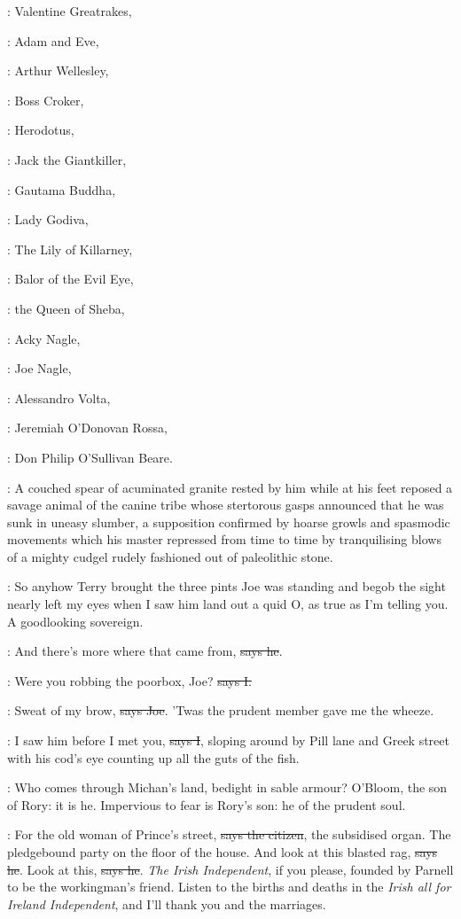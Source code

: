 :
Valentine Greatrakes,

:
Adam and Eve,

:
Arthur Wellesley,

:
Boss Croker,

:
Herodotus,

:
Jack the Giantkiller,

:
Gautama Buddha,

:
Lady Godiva,

:
The Lily of Killarney,

:
Balor of the Evil Eye,

:
the Queen of Sheba,

:
Acky Nagle,

:
Joe Nagle,

:
Alessandro Volta,

:
Jeremiah O'Donovan Rossa,

:
Don Philip O'Sullivan Beare.

:
A couched spear of acuminated granite rested by him
while at his feet
reposed a savage animal of the canine tribe whose stertorous gasps
announced that he was sunk in uneasy slumber, a supposition confirmed by
hoarse growls and spasmodic movements which his master repressed from time
to time by tranquilising blows of a mighty cudgel rudely fashioned out of
paleolithic stone.

\Nq:
So anyhow Terry brought the three pints Joe was standing and begob
the sight nearly left my eyes when I saw him land out a quid O, as true as
I'm telling you. A goodlooking sovereign.

\joe:
And there's more where that came from, \sout{says he}.

:
Were you robbing the poorbox, Joe? \sout{says I.}

\joe:
Sweat of my brow, \sout{says Joe}.
'Twas the prudent member gave me the wheeze.

:
I saw him before I met you, \sout{says I},
sloping around by Pill lane and
Greek street with his cod's eye counting up all the guts of the fish.

:
Who comes through Michan's land, bedight in sable armour? O'Bloom,
the son of Rory: it is he. Impervious to fear is Rory's son: he
of the prudent soul.

\citizen:
For the old woman of Prince's street,
\sout{says the citizen}, the subsidised
organ. The pledgebound party on the floor of the house. And look at this
blasted rag, \sout{says he}.
Look at this, \sout{says he}.
\emph{The Irish Independent}, if you
please, founded by Parnell to be the workingman's friend. Listen to the
births and deaths in the \emph{Irish all for Ireland Independent}, and I'll thank
you and the marriages.

